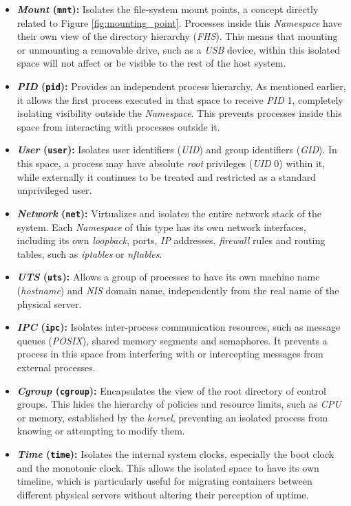 \begin{itemize}
    \item \textbf{\textit{Mount} (\texttt{mnt}):} Isolates the file-system mount points, a concept directly related to Figure \ref{fig:mounting_point}. Processes inside this \textit{Namespace} have their own view of the directory hierarchy (\textit{FHS}).
    This means that mounting or unmounting a removable drive, such as a \textit{USB} device, within this isolated space will not affect or be visible to the rest of the host system.
    \item \textbf{\textit{PID} (\texttt{pid}):} Provides an independent process hierarchy. As mentioned earlier, it allows the first process executed in that space to receive \textit{PID} 1,
    completely isolating visibility outside the \textit{Namespace}. This prevents processes inside this space from interacting with processes outside it.
    \item \textbf{\textit{User} (\texttt{user}):} Isolates user identifiers (\textit{UID}) and group identifiers (\textit{GID}).
    In this space, a process may have absolute \textit{root} privileges (\textit{UID} 0) within it, while externally it continues to be treated and restricted as a standard unprivileged user.
    \item \textbf{\textit{Network} (\texttt{net}):} Virtualizes and isolates the entire network stack of the system. Each \textit{Namespace} of this type has its own network interfaces, including its own \textit{loopback},
    ports, \textit{IP} addresses, \textit{firewall} rules and routing tables, such as \textit{iptables} or \textit{nftables}.
    \item \textbf{\textit{UTS} (\texttt{uts}):} Allows a group of processes to have its own machine name (\textit{hostname}) and \textit{NIS} domain name, independently from the real name of the physical server.
    \item \textbf{\textit{IPC} (\texttt{ipc}):} Isolates inter-process communication resources, such as message queues (\textit{POSIX}), shared memory segments and semaphores.
    It prevents a process in this space from interfering with or intercepting messages from external processes.
    \item \textbf{\textit{Cgroup} (\texttt{cgroup}):} Encapsulates the view of the root directory of control groups.
    This hides the hierarchy of policies and resource limits, such as \textit{CPU} or memory, established by the \textit{kernel}, preventing an isolated process from knowing or attempting to modify them.
    \item \textbf{\textit{Time} (\texttt{time}):} Isolates the internal system clocks, especially the boot clock and the monotonic clock.
    This allows the isolated space to have its own timeline, which is particularly useful for migrating containers between different physical servers without altering their perception of uptime.
\end{itemize}

